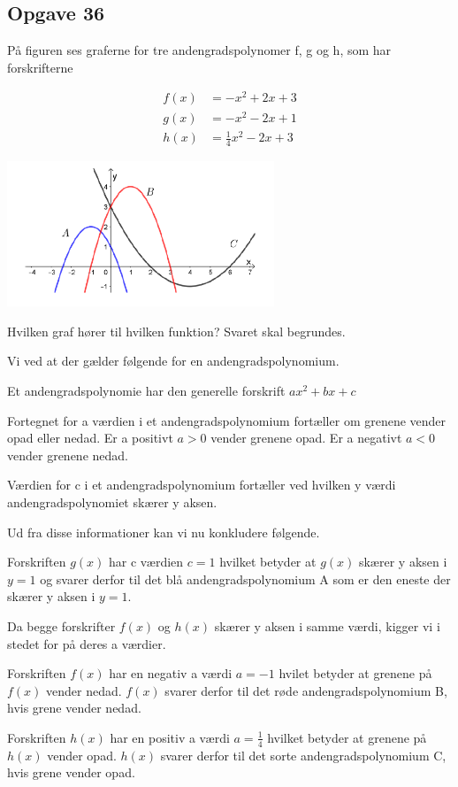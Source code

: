 \subsection{Opgave 36}

På figuren ses graferne for tre andengradspolynomer f, g og h, som har forskrifterne

\begin{align*}
    f(x) &= -x^2 +2x +3\\
    g(x) &= -x^2 -2x + 1\\
    h(x) &= \frac{1}{4}x^2 -2x + 3
\end{align*}

\includegraphics[width=8cm]{Opgave_31-40/Opgave_36/36.png}

Hvilken graf hører til hvilken funktion? Svaret skal begrundes.

\ans

Vi ved at der gælder følgende for en andengradspolynomium. 

Et andengradspolynomie har den generelle forskrift $ax^2 + bx + c$

Fortegnet for a værdien i et andengradspolynomium fortæller om grenene vender opad eller nedad.
Er a positivt $a > 0$ vender grenene opad.
Er a negativt $a < 0$ vender grenene nedad.

Værdien for c i et andengradspolynomium fortæller ved hvilken y værdi andengradspolynomiet skærer y aksen.

Ud fra disse informationer kan vi nu konkludere følgende.

Forskriften $g(x)$ har c værdien $c = 1$ hvilket betyder at $g(x)$ skærer y aksen i $y = 1$ og svarer derfor til det blå andengradspolynomium A
som er den eneste der skærer y aksen i $y = 1$.

Da begge forskrifter $f(x)$ og $h(x)$ skærer y aksen i samme værdi, kigger vi i stedet for på deres a værdier.

Forskriften $f(x)$ har en negativ a værdi $a = -1$ hvilet betyder at grenene på $f(x)$ vender nedad. $f(x)$ svarer derfor til det røde andengradspolynomium
B, hvis grene vender nedad.

Forskriften $h(x)$ har en positiv a værdi $a = \frac{1}{4}$ hvilket betyder at grenene på $h(x)$ vender opad. $h(x)$ svarer derfor til det sorte andengradspolynomium
C, hvis grene vender opad.  